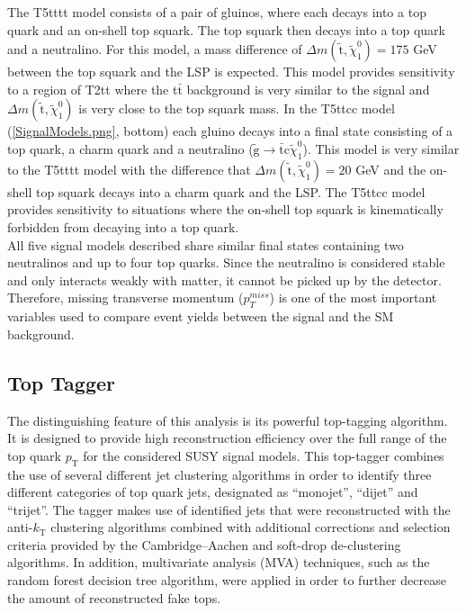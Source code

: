 The T5tttt model consists of a pair of gluinos, where each decays into a top quark and an on-shell top squark. The top squark then decays into a top quark and a neutralino. For this model, a mass difference of $\Delta m(\tilde{\text{t}},\tilde{\chi}_{1}^{0}) = 175$ GeV between the top squark and the LSP is expected. This model provides sensitivity to a region of T2tt where the t$\bar{\text{t}}$ background is very similar to the signal and $\Delta m(\tilde{\text{t}},\tilde{\chi}_{1}^{0})$ is very close to the top squark mass. In the T5ttcc model (\autoref{SignalModels.png}, bottom) each gluino decays into a final state consisting of a top quark, a charm quark and a neutralino ($\tilde{\text{g}}\rightarrow\bar{\text{t}}\text{c}\tilde{\chi}_{1}^{0}$). This model is very similar to the T5tttt model with the difference that $\Delta m(\tilde{\text{t}},\tilde{\chi}_{1}^{0}) = 20$ GeV and the on-shell top squark decays into a charm quark and the LSP. The T5ttcc model provides sensitivity to situations where the on-shell top squark is kinematically forbidden from decaying into a top quark.\\

All five signal models described share similar final states containing two neutralinos and up to four top quarks. Since the neutralino is considered stable and only interacts weakly with matter, it cannot be picked up by the detector. Therefore, missing transverse momentum ($p_{T}^{miss}$) is one of the most important variables used to compare event yields between the signal and the SM background.

\subsection{Top Tagger}\label{TopTaggerSec}

The distinguishing feature of this analysis is its powerful top-tagging algorithm. It is designed to provide high reconstruction efficiency over the full range of the top quark $p_\text{T}$ for the considered SUSY signal models. This top-tagger combines the use of several different jet clustering algorithms in order to identify three different categories of top quark jets, designated as ``monojet'', ``dijet'' and ``trijet''. The tagger makes use of identified jets that were reconstructed with the anti-$k_\text{T}$\cite{AntiKt} clustering algorithms combined with additional corrections and selection criteria provided by the Cambridge--Aachen\cite{JetAlg1} and soft-drop de-clustering\cite{SoftDrop} algorithms. In addition, multivariate analysis (MVA) techniques, such as the random forest decision tree algorithm\cite{RandForest1}, were applied in order to further decrease the amount of reconstructed fake tops.\\

